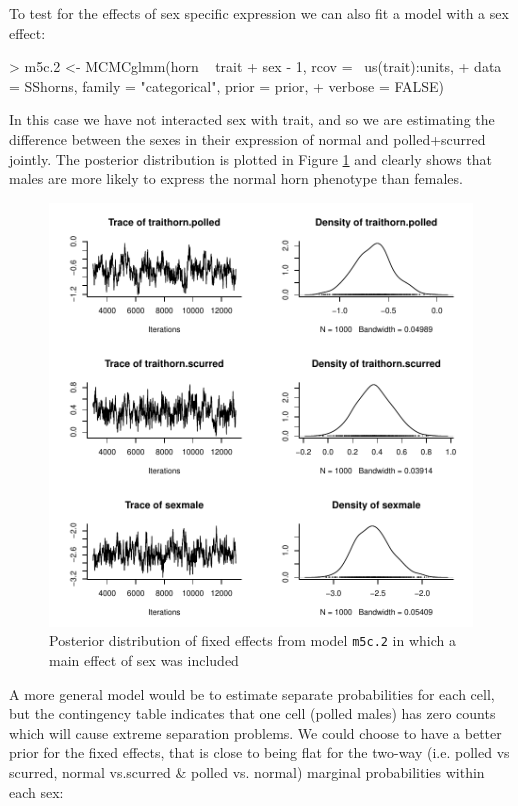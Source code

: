 \documentclass{article}
\begin{document}
To test for the effects of sex specific expression we can also fit a model with a sex effect:

\begin{Schunk}
\begin{Sinput}
> m5c.2 <- MCMCglmm(horn ~ trait + sex - 1, rcov = ~us(trait):units, 
+     data = SShorns, family = "categorical", prior = prior, 
+     verbose = FALSE)
\end{Sinput}
\end{Schunk}

In this case we have not interacted sex with trait, and so we are estimating the difference between the sexes in their expression of normal and polled+scurred jointly. The posterior distribution is plotted in Figure \ref{MN2} and clearly shows that males are more likely to express the normal horn phenotype than females.


\begin{figure}[!h]
\begin{center}
\includegraphics{Lecture5-029}
\end{center}
\caption{Posterior distribution of fixed effects from model \texttt{m5c.2} in which a main effect of sex was included}
\label{MN2}
\end{figure}

A more general model would be to estimate separate probabilities for each cell, but the contingency table indicates that one cell (polled males) has zero counts which will cause extreme separation problems. We could choose to have a better prior for the fixed effects, that is close to being flat for the two-way (i.e. polled vs scurred, normal vs.scurred \& polled vs. normal) marginal probabilities within each sex:
\end{document}
